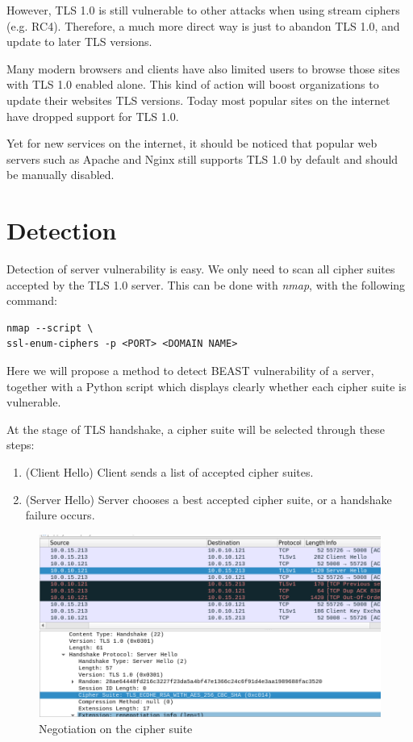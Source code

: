 \documentclass{acm_proc_article-sp}
\begin{document}
However, TLS 1.0 is still vulnerable to other attacks when using stream ciphers (e.g. RC4).
Therefore, a much more direct way is just to abandon TLS 1.0, and update to later TLS
versions.

Many modern browsers and clients have also limited users to browse those sites
with TLS 1.0 enabled alone. This kind of action will boost organizations to update their
websites TLS versions. Today most popular sites on the internet have dropped support for TLS 1.0.

Yet for new services on the internet, it should be noticed that popular web servers such as Apache
and Nginx still supports TLS 1.0 by default\cite{disable} and should be manually disabled.

\section{Detection}
Detection of server vulnerability is easy. We only need to scan all cipher suites accepted by the TLS
1.0 server. This can be done with \textit{nmap}, with the following command:
\begin{lstlisting}
nmap --script \
ssl-enum-ciphers -p <PORT> <DOMAIN NAME>
\end{lstlisting}

Here we will propose a method to detect BEAST vulnerability of a server, together with a
Python script which displays clearly whether each cipher suite is vulnerable.

At the stage of TLS handshake, a cipher suite will be selected through these steps:

\begin{enumerate}
    \item (Client Hello) Client sends a list of accepted cipher suites.
    \item (Server Hello) Server chooses a best accepted cipher suite, or a handshake failure occurs.
\end{enumerate}

\begin{figure}[htb]
    \centering
    \includegraphics[keepaspectratio, width=\linewidth]{./figures/tls-handshake-cipher-spec.png}
    \caption{Negotiation on the cipher suite}
\end{figure}
\end{document}
